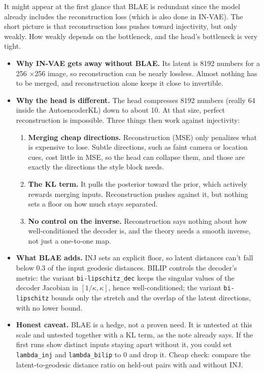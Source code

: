 \begin{enumerate}[label=(\arabic*),leftmargin=2em]
      It might appear at the first glance that BLAE is redundant since the model already includes
      the reconstruction loss (which is also done in IN-VAE).
      The short picture is that reconstruction loss pushes toward injectivity, but only weakly. How 
      weakly depends on the bottleneck, and the head's bottleneck is very tight.
      \begin{itemize}
      \item \textbf{Why IN-VAE gets away without BLAE.} Its latent is 8192 numbers for a 256
         $\times$256 image, so reconstruction can be nearly lossless. Almost nothing has to be 
         merged, and reconstruction alone keeps it close to invertible.
      \item \textbf{Why the head is different.} The head compresses 8192 numbers (really 64 inside 
        the AutoencoderKL) down to about 10. At that size, perfect reconstruction is impossible. 
        Three things then work against injectivity:
        \begin{enumerate}
	    \item \textbf{Merging cheap directions.} Reconstruction (MSE) only penalizes what is 
	       expensive to lose. Subtle directions, such as faint camera or location cues, cost little 
	       in MSE, so the head can collapse them, and those are exactly the directions the style 
	       block needs.
        \item \textbf{The KL term.} It pulls the posterior toward the prior, which actively rewards 
           merging inputs. Reconstruction pushes against it, but nothing sets a floor on how much 
           stays separated.
		\item \textbf{No control on the inverse.} Reconstruction says nothing about how 
		   well-conditioned the decoder is, and the theory needs a smooth inverse, not just a 
		   one-to-one map.
		\end{enumerate}
		\item \textbf{What BLAE adds.} INJ sets an explicit floor, so latent distances can't fall 
		   below 0.3 of the input geodesic distances. BILIP controls the decoder's metric: the
		   variant \texttt{bi-lipschitz\_dec} keeps the singular values of the decoder Jacobian
		   in $[1/\kappa,\kappa]$, hence well-conditioned; the variant \texttt{bi-lipschitz}
		   bounds only the stretch and the overlap of the latent directions, with no lower
		   bound.
		\item \textbf{Honest caveat.} BLAE is a hedge, not a proven need. It is untested at this 
		   scale and untested together with a KL term, as the note already says. If the first runs 
		   show distinct inputs staying apart without it, you could set \texttt{lambda\_inj} and 
		   \texttt{lambda\_bilip} to 0 and drop it. Cheap check: compare the latent-to-geodesic 
		   distance ratio on held-out pairs with and without INJ.
		\end{itemize}
\end{enumerate}

